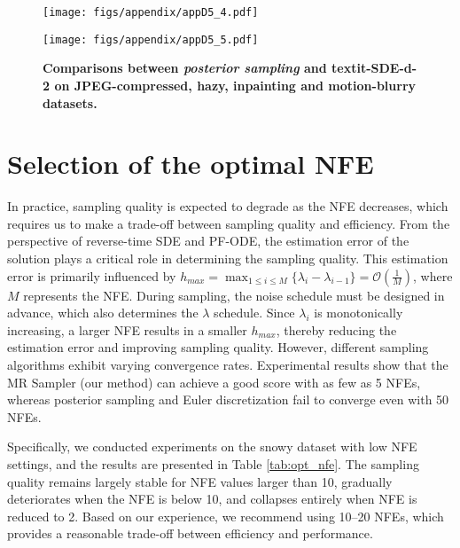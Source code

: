 \begin{figure}[h]
    \centering
    \begin{minipage}[b]{0.95\linewidth}
        \centering
        \texttt{[image: figs/appendix/appD5\_4.pdf]} %
    \end{minipage}
    \begin{minipage}[t]{0.95\linewidth}
        \centering
        \texttt{[image: figs/appendix/appD5\_5.pdf]} %
    \end{minipage}
    \caption{\textbf{Comparisons between \textit{posterior sampling} and textit{\ourmethod-SDE-d-2} on JPEG-compressed, hazy, inpainting and motion-blurry datasets.}}
    \label{fig:appd6(b)}
\end{figure}

\section{Selection of the optimal NFE}
\label{appe}

In practice, sampling quality is expected to degrade as the NFE decreases, which requires us to make a trade-off between sampling quality and efficiency. From the perspective of reverse-time SDE and PF-ODE, the estimation error of the solution plays a critical role in determining the sampling quality. This estimation error is primarily influenced by $h_{max} = \max_{1 \leq i \leq M}\{\lambda_i - \lambda_{i-1}\} = \mathcal{O}(\frac{1}{M})$, where $M$ represents the NFE. During sampling, the noise schedule must be designed in advance, which also determines the $\lambda$ schedule. Since $\lambda_i$ is monotonically increasing, a larger NFE results in a smaller $h_{max}$, thereby reducing the estimation error and improving sampling quality. However, different sampling algorithms exhibit varying convergence rates. Experimental results show that the MR Sampler (our method) can achieve a good score with as few as 5 NFEs, whereas posterior sampling and Euler discretization fail to converge even with 50 NFEs. 

Specifically, we conducted experiments on the snowy dataset with low NFE settings, and the results are presented in Table \ref{tab:opt_nfe}. The sampling quality remains largely stable for NFE values larger than 10, gradually deteriorates when the NFE is below 10, and collapses entirely when NFE is reduced to 2. Based on our experience, we recommend using 10–20 NFEs, which provides a reasonable trade-off between efficiency and performance.

